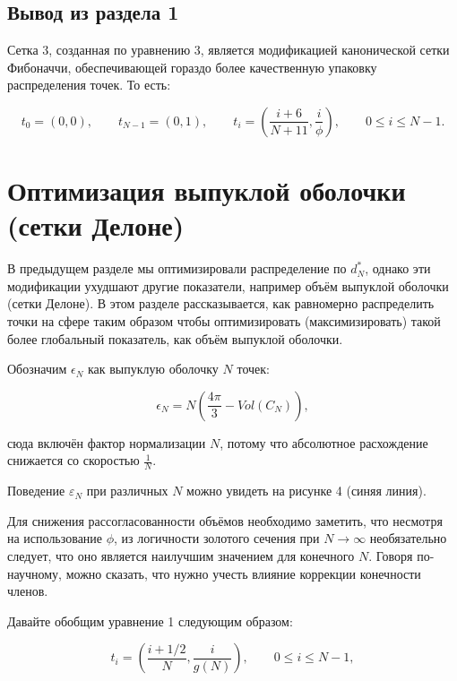 \documentclass[12pt, a4paper]{article}
\begin{document}
\subsection{Вывод из раздела 1}

Сетка 3, созданная по уравнению 3, является модификацией канонической сетки Фибоначчи, обеспечивающей гораздо более качественную упаковку распределения точек. То есть:

\begin{displaymath}
	t_0 = (0, 0),
	\qquad
	t_{N-1} = (0, 1),
	\qquad
	t_i = \left( \frac{i + 6}{N + 11}, \frac{i}{\phi} \right),
	\qquad
	0 \leq i \leq N-1.
	\tag{3}
\end{displaymath}

\newpage

\section{Оптимизация выпуклой оболочки (сетки Делоне)}

В предыдущем разделе мы оптимизировали распределение по $d^*_N$, однако эти модификации ухудшают другие показатели, например объём выпуклой оболочки (сетки Делоне). В этом разделе рассказывается, как равномерно распределить точки на сфере таким образом чтобы оптимизировать (максимизировать) такой более глобальный показатель, как объём выпуклой оболочки.

Обозначим $\epsilon_N$ как выпуклую оболочку $N$ точек:

\begin{displaymath}
	\epsilon_N = N \left( \frac{4 \pi}{3} - Vol(C_N) \right),
\end{displaymath}

\noindent сюда включён фактор нормализации $N$, потому что абсолютное расхождение снижается со скоростью $\frac{1}{N}$.

Поведение $\varepsilon_N$ при различных $N$ можно увидеть на рисунке 4 (синяя линия).

Для снижения рассогласованности объёмов необходимо заметить, что несмотря на использование $\phi$, из логичности золотого сечения при $N \rightarrow \infty$ необязательно следует, что оно является наилучшим значением для конечного $N$. Говоря по-научному, можно сказать, что нужно учесть влияние коррекции конечности членов.

Давайте обобщим уравнение 1 следующим образом:

\begin{displaymath}
	t_i = \left( \frac{i+1/2}{N}, \frac{i}{g(N)} \right), \qquad 0 \leq i \leq N-1,
	\tag{4}
\end{displaymath}
\end{document}
